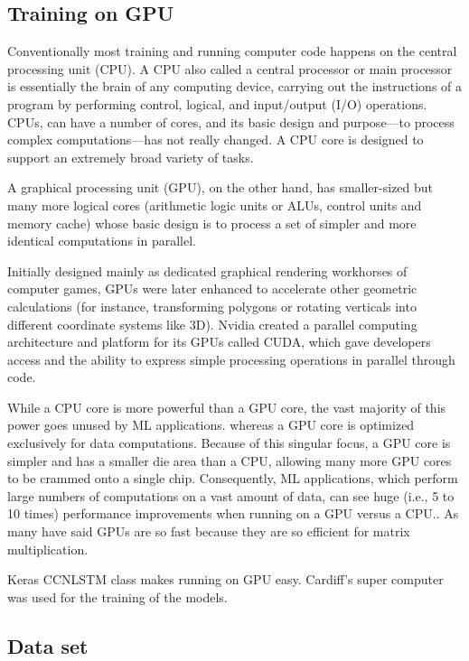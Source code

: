 \subsection{Training on GPU}

Conventionally most training and running computer code happens on the central
processing unit (CPU). A CPU also called a central processor or main processor
is essentially the brain of any computing device, carrying out the instructions
of a program by performing control, logical, and input/output (I/O) operations.
CPUs, can have a number of cores, and its basic design and purpose—to process
complex computations—has not really changed. A CPU core is designed to support
an extremely broad variety of tasks.

A graphical processing unit (GPU), on the other hand, has smaller-sized but many
more logical cores (arithmetic logic units or ALUs, control units and memory
cache) whose basic design is to process a set of simpler and more identical
computations in parallel.

Initially designed mainly as dedicated graphical rendering workhorses of
computer games, GPUs were later enhanced to accelerate other geometric
calculations (for instance, transforming polygons or rotating verticals into
different coordinate systems like 3D). Nvidia created a parallel computing
architecture and platform for its GPUs called CUDA, which gave developers access
and the ability to express simple processing operations in parallel through
code.

While a CPU core is more powerful than a GPU core, the vast majority of this
power goes unused by ML applications. whereas a GPU core is optimized
exclusively for data computations. Because of this singular focus, a GPU core is
simpler and has a smaller die area than a CPU, allowing many more GPU cores to
be crammed onto a single chip. Consequently, ML applications, which perform
large numbers of computations on a vast amount of data, can see huge (i.e., 5 to
10 times) performance improvements when running on a GPU versus a CPU..
As many have said GPUs are so fast because they are so efficient for matrix
multiplication.

Keras CCNLSTM class makes running on GPU easy. Cardiff's super computer
was used for the training of the models.

\subsection{Data set}

